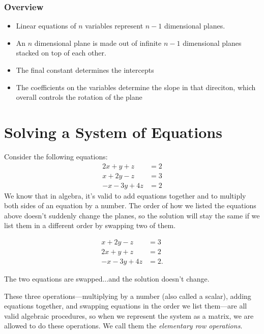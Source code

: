 \documentclass[12pt]{scrartcl}
\begin{document}
\subsubsection*{Overview}
\begin{itemize}
    \item Linear equations of $n$ variables represent $n-1$ dimensional planes.
    \item An $n$ dimensional plane is made out of infinite $n-1$ dimensional planes stacked on top of each other.
    \item The final constant determines the intercepts
    \item The coefficients on the variables determine the slope in that direciton, which overall controls the rotation of the plane
\end{itemize}

\newpage
\section*{Solving a System of Equations}
Consider the following equations:
\begin{align*}
    2x + y + z &= 2 \\
    x + 2y - z &= 3 \\
    -x - 3y + 4z &= 2
\end{align*}
We know that in algebra, it's valid to add equations together and to multiply both sides of an equation by a number. The order of how we listed the equations above doesn't suddenly change the planes, so the solution will stay the same if we list them in a different order by swapping two of them.

\vspace{-1em}
\begin{align*}
    x + 2y - z &= 3 \\
    2x + y + z &= 2 \\
    -x - 3y + 4z &= 2.
\end{align*}
\begin{center}
    The two equations are swapped...and the solution doesn't change.
\end{center}
\medskip

These three operations---multiplying by a number (also called a scalar), adding equations together, and swapping equations in the order we list them---are all valid algebraic procedures, so when we represent the system as a matrix, we are allowed to do these operations. We call them the \textit{elementary row operations}.
\end{document}
